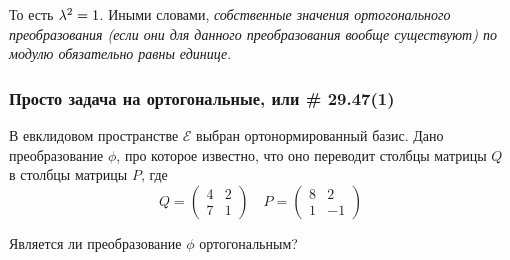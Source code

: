 \documentclass[a4paper,12pt]{article}
\theoremstyle{remark}
\begin{document}
  То есть $\lambda^2 \hm= 1$.
  Иными словами, \emph{собственные значения ортогонального преобразования (\emph{если они для данного преобразования вообще существуют}) по модулю обязательно равны единице}.
  
  
  
  \subsubsection{Просто задача на ортогональные, или \# 29.47(1)}
  
  В евклидовом пространстве $\mathcal E$ выбран ортонормированный базис.
  Дано преобразование $\phi$, про которое известно, что оно переводит столбцы матрицы $Q$ в столбцы матрицы $P$, где
  \[
    Q = \begin{pmatrix}
      4 & 2\\
      7 & 1
    \end{pmatrix}
    \quad P = \begin{pmatrix}
      8 & 2\\
      1 & -1
    \end{pmatrix}
  \]
  
  Является ли преобразование $\phi$ ортогональным?
  
\end{document}
